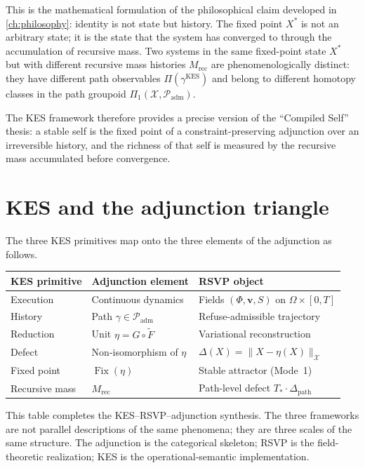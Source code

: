 \documentclass[12pt, oneside]{memoir}
\DeclareMathOperator{\Fix}{Fix}
\newcommand{\X}{\mathcal{X}}
\newcommand{\Ft}{\widetilde{F}}
\newcommand{\Padm}{\mathcal{P}_{\mathrm{adm}}}
\newcommand{\Dpth}{\Delta_{\mathrm{path}}}
\newcommand{\nnorm}[1]{\lVert #1 \rVert}
\newcommand{\bv}{\mathbf{v}}
\begin{document}
This is the mathematical formulation of the philosophical claim developed in
\cref{ch:philosophy}: identity is not state but history.  The fixed point $X^*$ is not
an arbitrary state; it is the state that the system has converged to through the
accumulation of recursive mass.  Two systems in the same fixed-point state $X^*$ but
with different recursive mass histories $M_{\mathrm{rec}}$ are phenomenologically
distinct: they have different path observables $\Pi(\gamma^{\mathrm{KES}})$ and belong
to different homotopy classes in the path groupoid $\Pi_1(\X, \Padm)$.

The KES framework therefore provides a precise version of the ``Compiled Self'' thesis:
a stable self is the fixed point of a constraint-preserving adjunction over an
irreversible history, and the richness of that self is measured by the recursive mass
accumulated before convergence.

\section{KES and the adjunction triangle}

The three KES primitives map onto the three elements of the adjunction as follows.

\begin{center}
\begin{tabular}{lll}
\toprule
\textbf{KES primitive} & \textbf{Adjunction element} & \textbf{RSVP object} \\
\midrule
Execution   & Continuous dynamics & Fields $(\Phi, \bv, S)$ on $\Omega \times [0,T]$ \\
History     & Path $\gamma \in \Padm$ & Refuse-admissible trajectory \\
Reduction   & Unit $\eta = G \circ \Ft$ & Variational reconstruction \\
Defect      & Non-isomorphism of $\eta$ & $\Delta(X) = \nnorm{X - \eta(X)}_\X$ \\
Fixed point & $\Fix(\eta)$            & Stable attractor (Mode~1) \\
Recursive mass & $M_{\mathrm{rec}}$  & Path-level defect $T_* \cdot \Dpth$ \\
\bottomrule
\end{tabular}
\end{center}

This table completes the KES--RSVP--adjunction synthesis.  The three frameworks are not
parallel descriptions of the same phenomena; they are three scales of the same structure.
The adjunction is the categorical skeleton; RSVP is the field-theoretic realization; KES
is the operational-semantic implementation.
\end{document}
